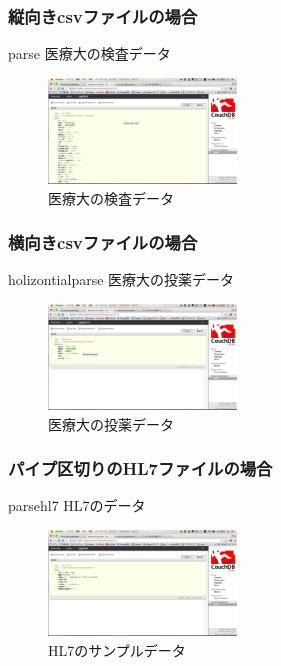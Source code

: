 		\subsubsection{縦向きcsvファイルの場合}
			parse
			医療大の検査データ
			\\
			\begin{figure}[htbp]
					\includegraphics[width=5cm, bb=0 0 437 688]{./gazou/kensa.png}
				\caption{医療大の検査データ}
				\label{ss-mix_sampledata}
			\end{figure}

		\subsubsection{横向きcsvファイルの場合}
			holizontialparse
			医療大の投薬データ
			\\
			\begin{figure}[htbp]
					\includegraphics[width=5cm, bb=0 0 437 688]{./gazou/touyaku.png}
				\caption{医療大の投薬データ}
				\label{ss-mix_sampledata}
			\end{figure}

		\subsubsection{パイプ区切りのHL7ファイルの場合}
			parsehl7
			HL7のデータ
			\\
			\begin{figure}[htbp]
					\includegraphics[width=5cm, bb=0 0 437 688]{./gazou/hl7.png}
				\caption{HL7のサンプルデータ}
				\label{ss-mix_sampledata}
			\end{figure}

